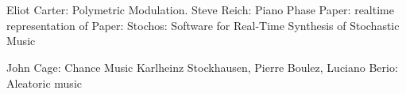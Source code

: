 
\chapter{\polytempic}
\label{ch:polytempic}

Eliot Carter: Polymetric Modulation. 
Steve Reich: Piano Phase
Paper: realtime representation of 
Paper: Stochos: Software for Real-Time Synthesis of Stochastic Music

John Cage: Chance Music
Karlheinz Stockhausen, Pierre Boulez, Luciano Berio: Aleatoric music



